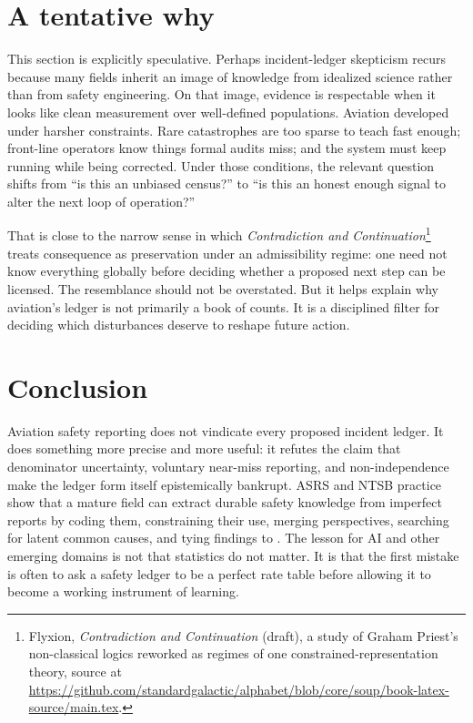 \documentclass[11pt]{article}
\begin{document}
\section{A tentative why}
This section is explicitly speculative. Perhaps incident-ledger skepticism recurs because many fields inherit an image of knowledge from idealized science rather than from safety engineering. On that image, evidence is respectable when it looks like clean measurement over well-defined populations. Aviation developed under harsher constraints. Rare catastrophes are too sparse to teach fast enough; front-line operators know things formal audits miss; and the system must keep running while being corrected. Under those conditions, the relevant question shifts from ``is this an unbiased census?'' to ``is this an honest enough signal to alter the next loop of operation?''

That is close to the narrow sense in which \textit{Contradiction and Continuation}\footnote{Flyxion, \emph{Contradiction and Continuation} (draft), a study of Graham Priest's non-classical logics reworked as regimes of one constrained-representation theory, source at \url{https://github.com/standardgalactic/alphabet/blob/core/soup/book-latex-source/main.tex}.} treats consequence as preservation under an admissibility regime: one need not know everything globally before deciding whether a proposed next step can be licensed. The resemblance should not be overstated. But it helps explain why aviation's ledger is not primarily a book of counts. It is a disciplined filter for deciding which disturbances deserve to reshape future action.

\section{Conclusion}
Aviation safety reporting does not vindicate every proposed incident ledger. It does something more precise and more useful: it refutes the claim that denominator uncertainty, voluntary near-miss reporting, and non-independence make the ledger form itself epistemically bankrupt. ASRS and NTSB practice show that a mature field can extract durable safety knowledge from imperfect reports by coding them, constraining their use, merging perspectives, searching for latent common causes, and tying findings to \repair. The lesson for AI and other emerging domains is not that statistics do not matter. It is that the first mistake is often to ask a safety ledger to be a perfect rate table before allowing it to become a working instrument of learning.
\end{document}
